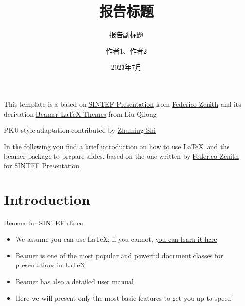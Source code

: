 \documentclass{beamer}
\title{报告标题}
\subtitle{报告副标题}
\author{作者1、作者2}
\date{2023年7月}
\newcommand{\hrefcol}[2]{\textcolor{cyan}{\href{#1}{#2}}}
\begin{document}
\maketitle

\begin{frame}

This template is a based on \hrefcol{https://www.overleaf.com/latex/templates/sintef-presentation/jhbhdffczpnx}{SINTEF Presentation} from \hrefcol{mailto:federico.zenith@sintef.no}{Federico Zenith} and its derivation \hrefcol{https://github.com/TOB-KNPOB/Beamer-LaTeX-Themes}{Beamer-LaTeX-Themes} from Liu Qilong

\vspace{\baselineskip}

PKU style adaptation contributed by \hrefcol{https://shizhuming.github.io}{Zhuming Shi}

\vspace{\baselineskip}

In the following you find a brief introduction on how to use \LaTeX\ and the beamer package to prepare slides, based on the one written by \hrefcol{mailto:federico.zenith@sintef.no}{Federico Zenith} for \hrefcol{https://www.overleaf.com/latex/templates/sintef-presentation/jhbhdffczpnx}{SINTEF Presentation}


\end{frame}

\section{Introduction}

\begin{frame}{Beamer for SINTEF slides}
\begin{itemize}
\item We assume you can use \LaTeX; if you cannot,
\hrefcol{http://en.wikibooks.org/wiki/LaTeX/}{you can learn it here}
\item Beamer is one of the most popular and powerful document
classes for presentations in \LaTeX
\item Beamer has also a detailed
\hrefcol{http://www.ctan.org/tex-archive/macros/latex/contrib/beamer/doc/beameruserguide.pdf}{user
 manual}
\item Here we will present only the most basic features to get you up to speed
\end{itemize}
\end{frame}
\end{document}
